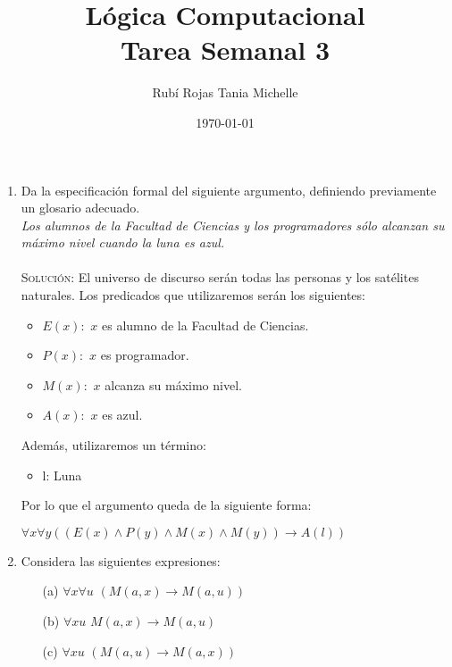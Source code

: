 \documentclass[letterpaper,11pt]{article}
\title{Lógica Computacional \\ Tarea Semanal 3}
\author{Rubí Rojas Tania Michelle}
\date{\today}
\begin{document}
    \maketitle

    \begin{enumerate}

        \item Da la especificación formal del siguiente argumento, definiendo
        previamente un glosario adecuado. \\
        \textit{Los alumnos de la Facultad de Ciencias y los programadores 
        sólo alcanzan su máximo nivel cuando la luna es azul.} \\  \\
        \textsc{Solución:} El universo de discurso serán todas las personas y
        los satélites naturales. Los predicados que utilizaremos serán los 
        siguientes:
        \begin{itemize}
            \item $E(x):$ $x$ es alumno de la Facultad de Ciencias.
            \item $P(x):$ $x$ es programador.
            \item $M(x):$ $x$ alcanza su máximo nivel.
            \item $A(x):$ $x$ es azul.
        \end{itemize}

        Además, utilizaremos un término:
        \begin{itemize}
            \item l: Luna
        \end{itemize}

        Por lo que el argumento queda de la siguiente forma:
        \begin{center}
            $\forall x \forall y ((E(x) \land P(y) \land 
            M(x) \land M(y)) \rightarrow A(l))$
        \end{center}

        \item Considera las siguientes expresiones:
        \begin{itemize}
            \item[(a)] $\forall x \forall u$ $(M(a,x) \rightarrow M(a,u))$
            \item[(b)] $\forall xu$ $M(a,x) \rightarrow M(a,u)$
            \item[(c)] $\forall xu$ $(M(a,u) \rightarrow M(a,x))$  


\end{itemize}
\end{enumerate}
\end{document}
